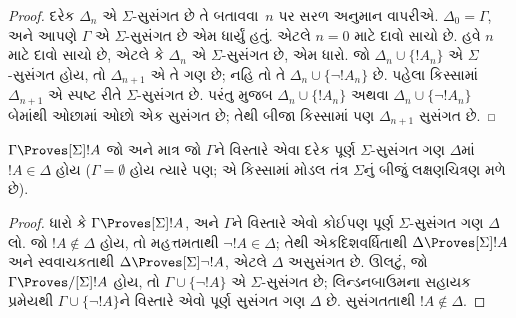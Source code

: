 \begin{proof}
દરેક $\Delta_n$ એ $\Sigma$-સુસંગત છે તે બતાવવા~$n$ પર સરળ અનુમાન
વાપરીએ. $\Delta_0 = \Gamma$, અને આપણે $\Gamma$ એ
$\Sigma$-સુસંગત છે એમ ધાર્યું હતું. એટલે $n = 0$ માટે દાવો સાચો
છે. હવે $n$ માટે દાવો સાચો છે, એટલે કે $\Delta_n$ એ
$\Sigma$-સુસંગત છે, એમ ધારો. જો $\Delta_n \cup \{!A_n\}$ એ
$\Sigma$-સુસંગત હોય, તો $\Delta_{n+1}$ એ તે ગણ છે; નહિ તો તે
$\Delta_n \cup \{\lnot!A_n\}$ છે. પહેલા કિસ્સામાં
$\Delta_{n+1}$ એ સ્પષ્ટ રીતે $\Sigma$-સુસંગત છે. પરંતુ
મુજબ $\Delta_n \cup \{!A_n\}$ અથવા $\Delta_n \cup \{\lnot!A_n\}$
બેમાંથી ઓછામાં ઓછો એક સુસંગત છે; તેથી બીજા કિસ્સામાં પણ
$\Delta_{n+1}$ સુસંગત છે.
\end{proof}

\begin{cor}
  $\Gamma \Proves[\Sigma] !A$ જો અને માત્ર જો $\Gamma$ને વિસ્તારે
  એવા દરેક પૂર્ણ $\Sigma$-સુસંગત ગણ $\Delta$માં $!A \in \Delta$
  હોય ($\Gamma = \emptyset$ હોય ત્યારે પણ; એ કિસ્સામાં મોડલ તંત્ર
  $\Sigma$નું બીજું લક્ષણચિત્રણ મળે છે).
\end{cor}

\begin{proof}
  ધારો કે $\Gamma \Proves[\Sigma] !A$, અને $\Gamma$ને વિસ્તારે
  એવો કોઈપણ પૂર્ણ $\Sigma$-સુસંગત ગણ $\Delta$ લો. જો $!A
  \notin \Delta$ હોય, તો મહત્તમતાથી $\lnot!A \in \Delta$;
  તેથી એકદિશવર્ધિતાથી $\Delta \Proves[\Sigma] !A$ અને સ્વવાચકતાથી
  $\Delta \Proves[\Sigma] \lnot!A$, એટલે $\Delta$ અસુસંગત છે.
  ઊલટું, જો $\Gamma \Proves/[\Sigma] !A$ હોય, તો $\Gamma \cup \{
  \lnot!A\}$ એ $\Sigma$-સુસંગત છે; લિન્ડનબાઉમના સહાયક પ્રમેયથી
  $\Gamma \cup \{ \lnot!A \}$ને વિસ્તારે એવો પૂર્ણ સુસંગત ગણ
  $\Delta$ છે. સુસંગતતાથી $!A \notin \Delta$.
\end{proof}
\endgroup

\begingroup
\makeatletter{}\makeatother


\label{guunit:OLP-0445}



